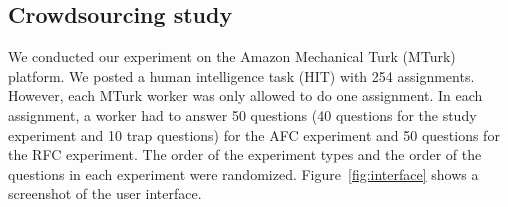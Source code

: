 \documentclass[a4paper,conference]{IEEEtran}
\begin{document}
\begin{comment}
    
\begin{table*}[t!]
\centering
\caption{Summary of the responses to the study questions in the two test conditions collected from 235 participants.} 
 \resizebox{1\textwidth}{!}{
\begin{tabular}{*{21}{c@{\ }}c}
Test condition & Number of dots & 302 & 304 & 306 & 308 & 310 & 312 & 314 & 316 & 318 & 320 & 322 & 324 & 326 & 328 & 330 & 332 & 334 & 336 & 338 & 340 \\ \hline
\multirow{2}{*}{AFC}& Correct answers & 254 &  256  & 284 &  269  & 306  & 294 &  309 &  320 &  318 &  339 &  359 &  370 &  349 &  367 &  383 &  374 &  382 &  366  & 392 &  404\\ 
& Wrong answers  & 210 &  208 &  183 &  197 &  160 &  175 &  158&   149 &  150  & 129  & 108 &   97 &  118   & 99  &  83  &  93  &  85 &  101 &   70  &  64
\\ 
\hline 
\multirow{3}{*}{RFC} & Correct answers &210  & 230  & 239 &  251 &  254  & 264  & 274  & 285  & 306  & 303 &  323 &  319 &  321 &  330   &362  & 350  & 352  & 385 &  357  & 377
\\  
& \say{not sure} answers   &  64   & 53   & 70  &  62  &  56  &  54  &  61  &  61  &  49  &  45 &  39  &  45 &   40  &  38  & 39  &  31 &   35  &  22  &  38  &  29 \\ 
& Wrong answers &190  & 181  & 158 &  153 &  156 &  151 & 132 &  123 &  113&   120 &  105  & 103 & 106 &   98 &   65  &  86  &  80  &  60  &  67 &   62\\ \hline 
\end{tabular}
}
\label{Table:data}
\end{table*}
\end{comment}

\subsection{Crowdsourcing study}

We conducted our experiment on the Amazon Mechanical Turk (MTurk) platform. We posted a human intelligence task (HIT) with 254 assignments. However, each MTurk worker was only allowed to do one assignment. In each assignment, a worker had to answer 50 questions (40 questions for the study experiment and 10 trap questions) for the AFC experiment and 50 questions for the RFC experiment. The order of the experiment types and the order of the questions in each experiment were randomized. Figure~\ref{fig:interface} shows a screenshot of the user interface.
\end{document}
